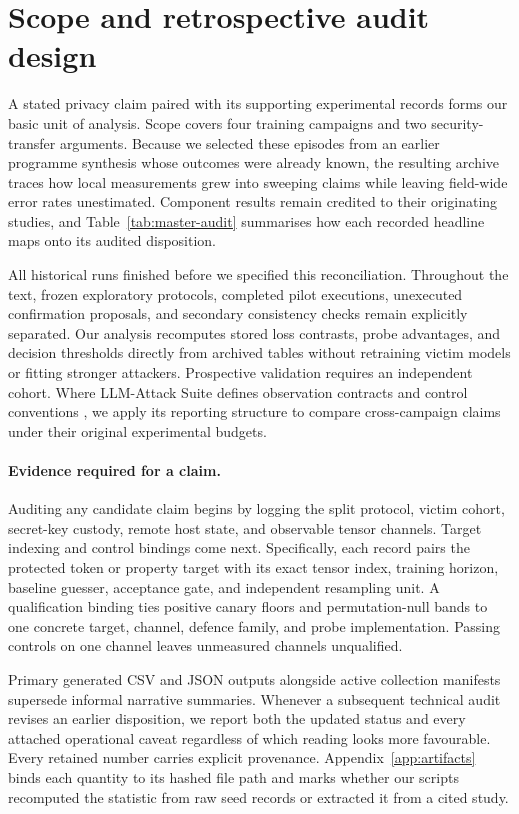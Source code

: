 \section{Scope and retrospective audit design}
\label{sec:design}

A stated privacy claim paired with its supporting experimental records forms
our basic unit of analysis. Scope covers four training campaigns and two
security-transfer arguments. Because we selected these episodes from an
earlier programme synthesis whose outcomes were already known, the resulting
archive traces how local measurements grew into sweeping claims while leaving
field-wide error rates unestimated. Component results remain credited to
their originating studies, and Table~\ref{tab:master-audit} summarises how
each recorded headline maps onto its audited disposition.

All historical runs finished before we specified this reconciliation.
Throughout the text, frozen exploratory protocols, completed pilot
executions, unexecuted confirmation proposals, and secondary consistency
checks remain explicitly separated. Our analysis recomputes stored loss
contrasts, probe advantages, and decision thresholds directly from archived
tables without retraining victim models or fitting stronger attackers.
Prospective validation requires an independent cohort. Where LLM-Attack
Suite defines observation contracts and control conventions
\cite{suite2026}, we apply its reporting structure to compare cross-campaign
claims under their original experimental budgets.

\paragraph{Evidence required for a claim.}
Auditing any candidate claim begins by logging the split protocol, victim
cohort, secret-key custody, remote host state, and observable tensor
channels. Target indexing and control bindings come next. Specifically, each
record pairs the protected token or property target with its exact tensor
index, training horizon, baseline guesser, acceptance gate, and independent
resampling unit. A qualification binding ties positive canary floors and
permutation-null bands to one concrete target, channel, defence family, and
probe implementation. Passing controls on one channel leaves unmeasured
channels unqualified.

Primary generated CSV and JSON outputs alongside active collection manifests
supersede informal narrative summaries. Whenever a subsequent technical
audit revises an earlier disposition, we report both the updated status and
every attached operational caveat regardless of which reading looks more
favourable. Every retained number carries explicit provenance.
Appendix~\ref{app:artifacts} binds each quantity to its hashed file path and
marks whether our scripts recomputed the statistic from raw seed records or
extracted it from a cited study.

